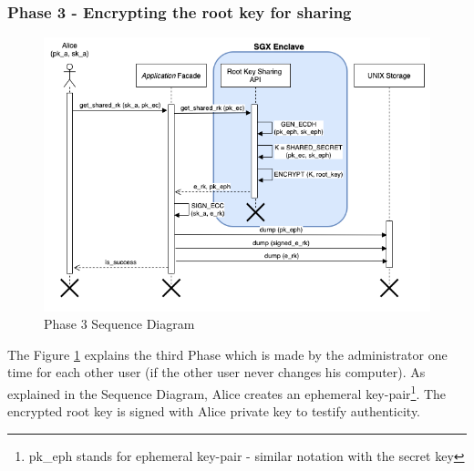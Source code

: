 \documentclass[../main.tex]{subfiles}
\begin{document}
\subsubsection{Phase 3 - Encrypting the root key for sharing}
\begin{figure}[h]
    \centering
    \includegraphics[width=\textwidth]{../../images/lauxus/upload_rk}
    
    \caption{Phase 3 Sequence Diagram}
    \label{figure:lauxus:upload_rk}
\end{figure}
\par The Figure \ref{figure:lauxus:upload_rk} explains the third Phase which is made by the administrator one time for each other user (if the other user never changes his computer). As explained in the Sequence Diagram, Alice creates an ephemeral key-pair\footnote{pk\_eph stands for ephemeral key-pair - similar notation with the secret key}. The encrypted root key is signed with Alice private key to testify authenticity.
\end{document}
